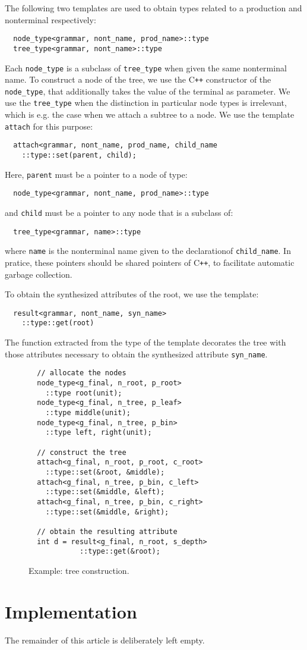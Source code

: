 \documentclass{llncs}
\newcommand*{\Cpp}{C\texttt{++}}
\begin{document}
  The following two templates are used to obtain
  types related to a production and nonterminal
  respectively:
  \begin{lstlisting}
  node_type<grammar, nont_name, prod_name>::type
  tree_type<grammar, nont_name>::type
  \end{lstlisting}
  Each \lstinline$node_type$ is a subclass of
  \lstinline$tree_type$ when given the same
  nonterminal name. To construct a node of the
  tree, we use the \Cpp{} constructor of the
  \lstinline$node_type$, that additionally
  takes the value of the terminal as parameter. 
  We use the \lstinline$tree_type$ when the
  distinction in particular node types is
  irrelevant, which is e.g. the case when
  we attach a subtree to a node. We use the
  template \lstinline$attach$ for
  this purpose:
  \begin{lstlisting}
  attach<grammar, nont_name, prod_name, child_name
    ::type::set(parent, child);
  \end{lstlisting}
  Here, \lstinline$parent$ must be a pointer to
  a node of type:
  \begin{lstlisting}
  node_type<grammar, nont_name, prod_name>::type
  \end{lstlisting}
  and \lstinline$child$ must be a pointer to
  any node that is a subclass of:
  \begin{lstlisting}
  tree_type<grammar, name>::type
  \end{lstlisting}
  where \lstinline$name$ is the nonterminal name
  given to the declarationof \lstinline$child_name$.
  In pratice, these pointers should be shared pointers
  of \Cpp, to facilitate automatic garbage collection.
  
  To obtain the synthesized attributes of the root,
  we use the template: 
  \begin{lstlisting}
  result<grammar, nont_name, syn_name>
    ::type::get(root)
  \end{lstlisting}
  The function extracted from the type of the template
  decorates the tree with those attributes necessary to obtain the
  synthesized attribute \lstinline$syn_name$.
  
  \begin{figure}[ht]
  \begin{lstlisting}
  // allocate the nodes
  node_type<g_final, n_root, p_root>
    ::type root(unit);
  node_type<g_final, n_tree, p_leaf>
    ::type middle(unit);
  node_type<g_final, n_tree, p_bin>
    ::type left, right(unit);

  // construct the tree
  attach<g_final, n_root, p_root, c_root>
    ::type::set(&root, &middle);
  attach<g_final, n_tree, p_bin, c_left>
    ::type::set(&middle, &left);
  attach<g_final, n_tree, p_bin, c_right>
    ::type::set(&middle, &right);

  // obtain the resulting attribute
  int d = result<g_final, n_root, s_depth>
            ::type::get(&root);
  \end{lstlisting}
  \caption{Example: tree construction.}
  \label{fig:example:construct}
  \end{figure}

\section{Implementation}
\label{sec:implementation}

  The remainder of this article is deliberately left empty.



\end{document}
